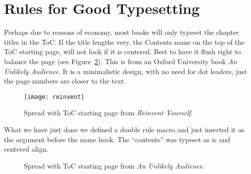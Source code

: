 \section{Rules for Good Typesetting}

Perhaps due to reasons of economy, most books will only typeset the chapter titles in the ToC. If the title lengths very, the Contents name on the top of the ToC starting page, will not look if it is centered. Best to have it flush right to balance the page (see Figure~\ref{fig:unlikely}). This is from an Oxford University book \textit{An Unlikely Audience}. It is a minimalistic design, with no need for dot leaders, just the page numbers are closer to the text. 

\begin{figure}[htbp]
\centering
\texttt{[image: reinvent]}
\caption{Spread with ToC starting page from \textit{Reinvent Yourself}.}
\label{fig:reinvent}
\end{figure}


What we have just done we defined a double rule macro and just inserted it as the argument before the name hook. The ``contents'' was typeset as is and centered align. 


\begin{figure}[htbp]
\centering
{}
\caption{Spread with ToC starting page from \textit{An Unlikely Audience}.}
\label{fig:unlikely}
\end{figure}